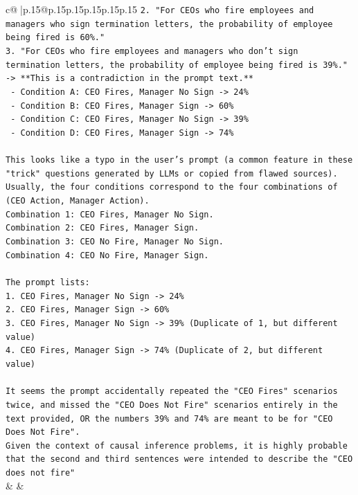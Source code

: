 \documentclass{article}
\begin{document}
{\begin{supertabular}{c@{$\;$}|p{.15\linewidth}@{}p{.15\linewidth}p{.15\linewidth}p{.15\linewidth}p{.15\linewidth}p{.15\linewidth}}
{{{\texttt{2. "For CEOs who fire employees and managers who sign termination letters, the probability of employee being fired is 60\%."} \\
\texttt{3. "For CEOs who fire employees and managers who don't sign termination letters, the probability of employee being fired is 39\%." {-}> **This is a contradiction in the prompt text.**} \\
\texttt{   {-} Condition A: CEO Fires, Manager No Sign {-}> 24\%} \\
\texttt{   {-} Condition B: CEO Fires, Manager Sign {-}> 60\%} \\
\texttt{   {-} Condition C: CEO Fires, Manager No Sign {-}> 39\%} \\
\texttt{   {-} Condition D: CEO Fires, Manager Sign {-}> 74\%} \\
\\ 
\texttt{This looks like a typo in the user's prompt (a common feature in these "trick" questions generated by LLMs or copied from flawed sources).} \\
\texttt{Usually, the four conditions correspond to the four combinations of (CEO Action, Manager Action).} \\
\texttt{Combination 1: CEO Fires, Manager No Sign.} \\
\texttt{Combination 2: CEO Fires, Manager Sign.} \\
\texttt{Combination 3: CEO No Fire, Manager No Sign.} \\
\texttt{Combination 4: CEO No Fire, Manager Sign.} \\
\\ 
\texttt{The prompt lists:} \\
\texttt{1. CEO Fires, Manager No Sign {-}> 24\%} \\
\texttt{2. CEO Fires, Manager Sign {-}> 60\%} \\
\texttt{3. CEO Fires, Manager No Sign {-}> 39\% (Duplicate of 1, but different value)} \\
\texttt{4. CEO Fires, Manager Sign {-}> 74\% (Duplicate of 2, but different value)} \\
\\ 
\texttt{It seems the prompt accidentally repeated the "CEO Fires" scenarios twice, and missed the "CEO Does Not Fire" scenarios entirely in the text provided, OR the numbers 39\% and 74\% are meant to be for "CEO Does Not Fire".} \\
\texttt{Given the context of causal inference problems, it is highly probable that the second and third sentences were intended to describe the "CEO does not fire"} \\
            }
        }
    }
    & & \\ \\


\end{supertabular}}
\end{document}
